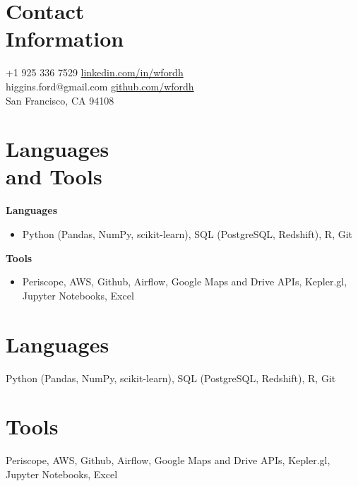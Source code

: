 \documentclass[line, margin]{res}
\begin{document}

\begin{resume}
	
	
\section{Contact \\ Information}
	+1 925 336 7529       \hfill \href{https://linkedin.com/in/wfordh/}{linkedin.com/in/wfordh} \\
	\noindent higgins.ford@gmail.com  \hfill \href{https://github.com/wfordh}{github.com/wfordh} \\
	\noindent San Francisco, CA 94108
	

\section{Languages \\ and Tools} 
	\textbf{Languages} \
	\begin{itemize}
		\item Python (Pandas, NumPy, scikit-learn), SQL (PostgreSQL, Redshift), R, Git %
	\end{itemize} 
	\textbf{Tools} \
	\begin{itemize}
		\item Periscope, AWS, Github, Airflow, Google Maps and Drive APIs, Kepler.gl, Jupyter Notebooks, Excel
	\end{itemize}

\section{Languages}
	Python (Pandas, NumPy, scikit-learn), SQL (PostgreSQL, Redshift), R, Git
	
\section{Tools}
	Periscope, AWS, Github, Airflow, Google Maps and Drive APIs, Kepler.gl, Jupyter Notebooks, Excel



\end{resume}
\end{document}
